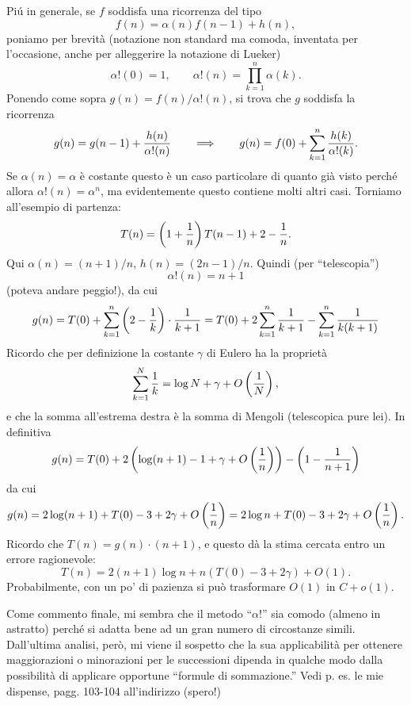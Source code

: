 \documentclass{article}[12]
\begin{document}
Pi\'u in generale, se $f$ soddisfa una ricorrenza del tipo 
$$
f(n) = \alpha(n) f(n-1) + h(n),
$$
poniamo per brevit\`a (notazione non standard ma comoda, inventata per
l'oc\-ca\-sio\-ne, 
anche per alleggerire la notazione di Lueker) 
$$
\alpha!(0) = 1,
\qquad
\alpha!(n) = \prod_{k=1}^n \alpha(k).
$$
Ponendo come sopra $g(n) = f(n)/\alpha!(n)$, si trova che $g$ soddisfa
la ricorrenza 
$$
g(n) = g(n-1) + {h(n)\over\alpha!(n)}
\qquad\Longrightarrow\qquad
g(n) = f(0) + \sum_{k=1}^n {h(k)\over\alpha!(k)}.
$$
Se $\alpha(n)=\alpha$ \`e costante questo \`e un caso particolare di
quanto gi\`a visto 
perch\'e allora $\alpha!(n)=\alpha^n$, ma evidentemente questo
contiene molti altri casi. 
Torniamo all'esempio di partenza: 
$$
T(n) = \left( 1 + {1\over n} \right) T(n-1) + 2 - {1\over n}.
$$
Qui $\alpha(n)=(n+1)/n$, $h(n) = (2n-1)/n$. Quindi (per
``telescopia'') 
$$
\alpha!(n) = n+1
$$
(poteva andare peggio!), da cui 
$$
g(n) = T(0) + \sum_{k=1}^n \left( 2-{1\over k} \right)\cdot{1\over
k+1}
= T(0) + 2 \sum_{k=1}^n {1\over k+1} - \sum_{k=1}^n {1\over k(k+1)}
$$
Ricordo che per definizione la costante $\gamma$ di Eulero ha la
propriet\`a 
$$
\sum_{k=1}^N {1\over k} = \log N + \gamma + O\left( 1\over N \right),
$$
e che la somma all'estrema destra \`e la somma di Mengoli (telescopica
pure lei). In definitiva 
$$
g(n) = T(0) + 2\left( \log(n+1)-1+\gamma + O\left( 1\over n \right)
\right) - \left( 1-{1\over n+1}\right)
$$
da cui 
$$
g(n) = 2\log(n+1) + T(0) - 3 + 2\gamma + O\left( 1\over n \right)
= 2\log n + T(0) - 3 + 2\gamma + O\left( 1\over n \right).
$$
Ricordo che $T(n) = g(n)\cdot(n+1)$, e questo d\`a la stima cercata
entro un errore ragionevole: 
$$
T(n) = 2(n+1) \log n + n (T(0)-3+2\gamma) + O(1).
$$
Probabilmente, con un po' di pazienza si pu\`o trasformare $O(1)$ in
$C+o(1)$. 

Come commento finale, mi sembra che il metodo ``$\alpha!$'' sia comodo
(almeno in astratto) 
perch\'e si adatta bene ad un gran numero di circostanze simili.
Dall'ultima analisi, per\`o, mi 
viene il sospetto che la sua applicabilit\`a per ottenere
maggiorazioni o minorazioni per le 
successioni dipenda in qualche modo dalla possibilit\`a di applicare
opportune ``formule di 
sommazione.'' Vedi p. es. le mie dispense, pagg. 103-104 all'indirizzo
(spero!)

\end{document}
